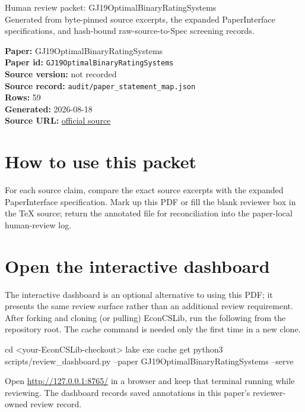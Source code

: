 \documentclass[10pt]{article}
\begin{document}
\fontsize{9}{10}\selectfont

\begin{center}
{\LARGE Human review packet: GJ19OptimalBinaryRatingSystems}\\[0.35em]
\small Generated from byte-pinned source excerpts, the expanded PaperInterface
specifications, and hash-bound raw-source-to-Spec screening records.
\end{center}

\noindent\textbf{Paper:} GJ19OptimalBinaryRatingSystems\\
\textbf{Paper id:} \texttt{GJ19OptimalBinaryRatingSystems}\\
\textbf{Source version:} not recorded\\
\textbf{Source record:} \texttt{audit/paper\_statement\_map.json}\\
\textbf{Rows:} 59\\
\textbf{Generated:} 2026-08-18\\
\textbf{Source URL:} \href{https://proceedings.mlr.press/v89/garg19a.html}{official source}

\noindent{}\par



\section*{How to use this packet}
For each source claim, compare the exact source excerpts with the expanded
PaperInterface specification. Mark up this PDF or fill the blank reviewer box in the TeX source;
return the annotated file for reconciliation into the paper-local human-review
log.

\section*{Open the interactive dashboard}
The interactive dashboard is an optional alternative to using this PDF; it
presents the same review surface rather than an additional review requirement.
After forking and cloning (or pulling) EconCSLib, run the following from the
repository root. The cache command is needed only the first time in a new clone.
\begin{ReviewVerbatim}
cd <your-EconCSLib-checkout>
lake exe cache get
python3 scripts/review_dashboard.py --paper GJ19OptimalBinaryRatingSystems --serve
\end{ReviewVerbatim}
Open \url{http://127.0.0.1:8765/} in a browser and keep that terminal running
while reviewing. The dashboard records saved annotations in this paper's
reviewer-owned review record.
\end{document}
